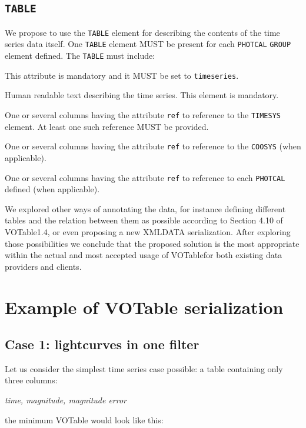 \documentclass[11pt,a4paper]{ivoa}
\let\fg=\color
\def\attr#1{{\tt{\fg{DarkRed}#1}}}
\def\elem#1{{\tt{\fg{DarkRed}#1}}}
\def\attrval#1#2{{\tt{\fg{DarkRed}#1}="{\fg{DarkPurple}#2}"}}
\begin{document}
\subsection{\elem{TABLE}}
We propose to use the \elem{TABLE} element for describing the contents of the time series data itself. One \elem{TABLE} element MUST be present for each \elem{PHOTCAL} \elem{GROUP} element defined. 
The \elem{TABLE} must include:
\begin{description}
     \item[\attrval{utype}{timeseries}] This attribute is mandatory and it MUST be set to \verb|timeseries|. 
     \item[\attr{DESCRIPTION}] Human readable text describing the time series. This element is mandatory. 
     \item One or several columns having the attribute \elem{ref} to reference to the \elem{TIMESYS} element. At least one such reference MUST be provided.
     \item One or several columns having the attribute \elem{ref} to reference to the \elem{COOSYS} (when applicable). 
     \item One or several columns having the attribute \elem{ref} to reference to each \elem{PHOTCAL} defined (when applicable). 
\end{description}

We explored other ways of annotating the data, for instance defining different tables and the relation between them as possible according to Section 4.10 of VOTable1.4, or even proposing a new XMLDATA serialization. After exploring those possibilities we conclude that the proposed solution is the most appropriate within the actual and most accepted usage of VOTablefor both existing data providers and clients.

\section{Example of VOTable serialization}
\subsection{Case 1: lightcurves in one filter}
Let us consider the simplest time series case possible: a table containing only three columns:
\begin{center}
   \emph{time, magnitude, magnitude error}
\end{center}
the minimum VOTable would look like this:

\end{document}
